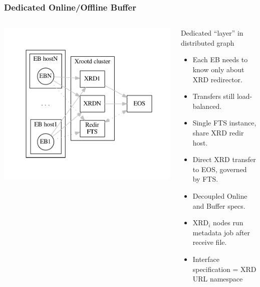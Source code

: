 \documentclass[xcolor=dvipsnames]{beamer}
\begin{document}
\begin{frame}
  \frametitle{Dedicated Online/Offline Buffer} 
  \begin{columns}
    \begin{column}{0.4\textwidth}
      \includegraphics[width=\textwidth,clip,trim=5mm 0 5mm 0]{doob-join.pdf}
    \end{column}
    \begin{column}{0.65\textwidth}
      Dedicated ``layer'' in distributed graph
      \begin{itemize}\footnotesize
      \item Each EB needs to know only about XRD redirector.
      \item Transfers still load-balanced.
      \item Single FTS instance, share XRD redir host.
      \item Direct XRD transfer to EOS, governed by FTS.
      \item Decoupled Online and Buffer specs.
      \item XRD$_i$ nodes run metadata job after receive file.
      \item Interface specification = XRD URL namespace
      \end{itemize}
    \end{column}
  \end{columns}
  
\end{frame}
\end{document}
